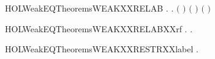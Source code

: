 \newcommand{\HOLWeakEQTheoremsWEAKXXPROPERTYXXSTAR}{\UseVerbatim{HOLWeakEQTheoremsWEAKXXPROPERTYXXSTAR}}
\begin{SaveVerbatim}{HOLWeakEQTheoremsWEAKXXRELAB}
\HOLTokenTurnstile{} \HOLSymConst{\HOLTokenForall{}}  .
        \HOLTokenWeakTransBegin{}\HOLTokenWeakTransEnd {} \HOLSymConst{\HOLTokenImp{}}
       \HOLSymConst{\HOLTokenForall{}}.
             \ensuremath{(} \ensuremath{)}
           \HOLTokenWeakTransBegin{} \ensuremath{(} \ensuremath{)} \HOLTokenWeakTransEnd
             \ensuremath{(} \ensuremath{)}
\end{SaveVerbatim}
\newcommand{\HOLWeakEQTheoremsWEAKXXRELAB}{\UseVerbatim{HOLWeakEQTheoremsWEAKXXRELAB}}
\begin{SaveVerbatim}{HOLWeakEQTheoremsWEAKXXRELABXXrf}
\HOLTokenTurnstile{} \HOLSymConst{\HOLTokenForall{}}  .
        \HOLTokenWeakTransBegin{}\HOLTokenWeakTransEnd {} \HOLSymConst{\HOLTokenImp{}} \HOLSymConst{\HOLTokenForall{}}.    \HOLTokenWeakTransBegin{}  \HOLTokenWeakTransEnd {}  
\end{SaveVerbatim}
\newcommand{\HOLWeakEQTheoremsWEAKXXRELABXXrf}{\UseVerbatim{HOLWeakEQTheoremsWEAKXXRELABXXrf}}
\begin{SaveVerbatim}{HOLWeakEQTheoremsWEAKXXRESTRXXlabel}
\HOLTokenTurnstile{} \HOLSymConst{\HOLTokenForall{}}   .
        \HOLConst{\HOLTokenNotIn{}}  \HOLSymConst{\HOLTokenConj{}}   \HOLConst{\HOLTokenNotIn{}}  \HOLSymConst{\HOLTokenConj{}}  \HOLTokenWeakTransBegin{} \HOLTokenWeakTransEnd {} \HOLSymConst{\HOLTokenImp{}}
          \HOLTokenWeakTransBegin{} \HOLTokenWeakTransEnd {}  
\end{SaveVerbatim}
